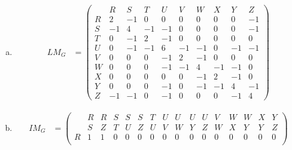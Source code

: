 \documentclass[10pt,letterpaper, cm]{hmcpset}
\begin{document}
\begin{enumerate}[(a)]

    \item 
    
    \begin{align*}

      LM_G &= \begin{pmatrix}


             & R & S & T & U & V & W & X & Y & Z \\        

         R   & 2 & -1 & 0 & 0 & 0 & 0 & 0 & 0 & -1 \\

         S   & -1 & 4 & -1 & -1 & 0 & 0 & 0 & 0 & -1 \\

         T   & 0 & -1 & 2 & -1 & 0 & 0 & 0 & 0 & 0 \\

         U   & 0 & -1 & -1 & 6 & -1 & -1 & 0 & -1 & -1  \\

         V   & 0 & 0 & 0 & -1 & 2 & -1 & 0 & 0 & 0 \\

         W   & 0 & 0 & 0 & -1 & -1 & 4 & -1 & -1 & 0 \\

         X   & 0 & 0 & 0 & 0 & 0 & -1 & 2 & -1 & 0 \\

         Y   & 0 & 0 & 0 & -1 & 0 & -1 & -1 & 4 & -1 \\

         Z   & -1 & -1 & 0 & -1 & 0 & 0 & 0 & -1 & 4

      \end{pmatrix}  
              \end{align*}
    \item 
    
    \begin{align*}
  
      IM_G &= \begin{pmatrix}


             & R & R & S & S & S & T & U & U & U & U & V & W & W & X & Y\\        

             & S & Z & T & U & Z & U & V & W & Y & Z & W & X & Y & Y & Z \\

         R   & 1 & 1 & 0 & 0 & 0 & 0 & 0 & 0 & 0 & 0 & 0 & 0 & 0 & 0 & 0\\


\end{pmatrix}
\end{align*}
\end{enumerate}
\end{document}
